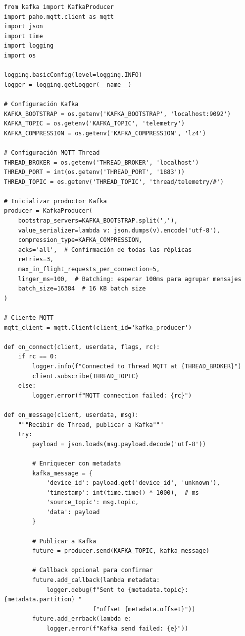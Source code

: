 \begin{verbatim}
from kafka import KafkaProducer
import paho.mqtt.client as mqtt
import json
import time
import logging
import os

logging.basicConfig(level=logging.INFO)
logger = logging.getLogger(__name__)

# Configuración Kafka
KAFKA_BOOTSTRAP = os.getenv('KAFKA_BOOTSTRAP', 'localhost:9092')
KAFKA_TOPIC = os.getenv('KAFKA_TOPIC', 'telemetry')
KAFKA_COMPRESSION = os.getenv('KAFKA_COMPRESSION', 'lz4')

# Configuración MQTT Thread
THREAD_BROKER = os.getenv('THREAD_BROKER', 'localhost')
THREAD_PORT = int(os.getenv('THREAD_PORT', '1883'))
THREAD_TOPIC = os.getenv('THREAD_TOPIC', 'thread/telemetry/#')

# Inicializar productor Kafka
producer = KafkaProducer(
    bootstrap_servers=KAFKA_BOOTSTRAP.split(','),
    value_serializer=lambda v: json.dumps(v).encode('utf-8'),
    compression_type=KAFKA_COMPRESSION,
    acks='all',  # Confirmación de todas las réplicas
    retries=3,
    max_in_flight_requests_per_connection=5,
    linger_ms=100,  # Batching: esperar 100ms para agrupar mensajes
    batch_size=16384  # 16 KB batch size
)

# Cliente MQTT
mqtt_client = mqtt.Client(client_id='kafka_producer')

def on_connect(client, userdata, flags, rc):
    if rc == 0:
        logger.info(f"Connected to Thread MQTT at {THREAD_BROKER}")
        client.subscribe(THREAD_TOPIC)
    else:
        logger.error(f"MQTT connection failed: {rc}")

def on_message(client, userdata, msg):
    """Recibir de Thread, publicar a Kafka"""
    try:
        payload = json.loads(msg.payload.decode('utf-8'))
        
        # Enriquecer con metadata
        kafka_message = {
            'device_id': payload.get('device_id', 'unknown'),
            'timestamp': int(time.time() * 1000),  # ms
            'source_topic': msg.topic,
            'data': payload
        }
        
        # Publicar a Kafka
        future = producer.send(KAFKA_TOPIC, kafka_message)
        
        # Callback opcional para confirmar
        future.add_callback(lambda metadata: 
            logger.debug(f"Sent to {metadata.topic}:{metadata.partition} "
                         f"offset {metadata.offset}"))
        future.add_errback(lambda e: 
            logger.error(f"Kafka send failed: {e}"))
    

\end{verbatim}
